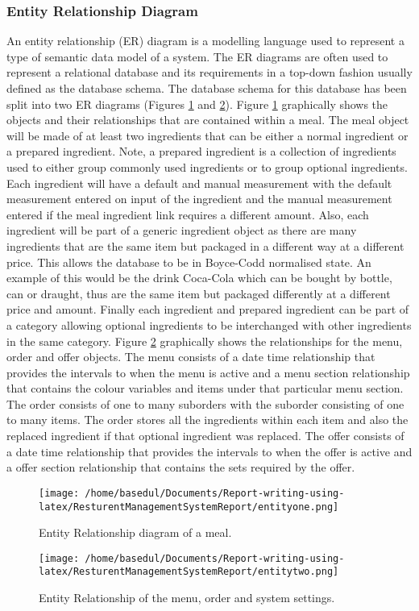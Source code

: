 \documentclass[12pt,a4paper]{article}
\begin{document}
\subsubsection{Entity Relationship Diagram}
An entity relationship (ER) diagram is a modelling language used to represent a type of semantic
data model of a system. The ER diagrams are often used to represent a relational database and its
requirements in a top-down fashion usually defined as the database schema. The database schema for
this database has been split into two ER diagrams (Figures \ref{fig:entityone} and \ref{fig:entitytwo}).
Figure \ref{fig:entityone} graphically shows the objects and their relationships that are contained within a meal.
The meal object will be made of at least two ingredients that can be either a normal ingredient or
a prepared ingredient. Note, a prepared ingredient is a collection of ingredients used to either group
commonly used ingredients or to group optional ingredients. Each ingredient will have a default and
manual measurement with the default measurement entered on input of the ingredient and the manual
measurement entered if the meal ingredient link requires a different amount.
Also, each ingredient will be part of a generic ingredient object as there are many ingredients that
are the same item but packaged in a different way at a different price. This allows the database to be in
Boyce-Codd normalised state. An example of this would be the drink Coca-Cola which can be bought
by bottle, can or draught, thus are the same item but packaged differently at a different price and
amount. Finally each ingredient and prepared ingredient can be part of a category allowing optional
ingredients to be interchanged with other ingredients in the same category.
Figure \ref{fig:entitytwo} graphically shows the relationships for the menu, order and offer objects. The menu
consists of a date time relationship that provides the intervals to when the menu is active and a menu
section relationship that contains the colour variables and items under that particular menu section.
The order consists of one to many suborders with the suborder consisting of one to many items.
The order stores all the ingredients within each item and also the replaced ingredient if that optional
ingredient was replaced.
The offer consists of a date time relationship that provides the intervals to when the offer is active
and a offer section relationship that contains the sets required by the offer.
\begin{figure}[H]
		\centering
		\texttt{[image: /home/basedul/Documents/Report-writing-using-latex/ResturentManagementSystemReport/entityone.png]}
		\caption{Entity Relationship diagram of a meal.}
		\label{fig:entityone} 
	\end{figure}
\begin{figure}[H]
		\centering
		\texttt{[image: /home/basedul/Documents/Report-writing-using-latex/ResturentManagementSystemReport/entitytwo.png]}
		\caption{Entity Relationship of the menu, order and system settings.}
		\label{fig:entitytwo} 
	\end{figure}
\end{document}

